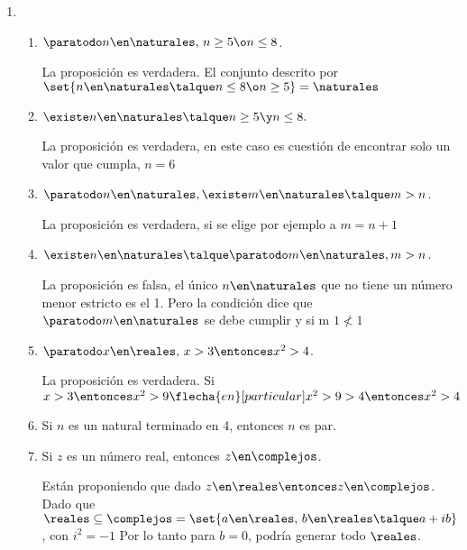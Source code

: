 \begin{enumerate}[label=\roman*)]
  \item

        \begin{enumerate}[label=(\alph*)]
          \item $\paratodo n \en \naturales,\, n \geq 5 \o n \leq 8$.\par
                La proposición es verdadera. El conjunto descrito por $\set{ n \en \naturales \talque n \leq 8 \o n \geq 5} = \naturales$\par
                \doceiA                        \par

          \item $\existe n \en \naturales \talque n \geq 5 \y n\leq 8.$\par
                La proposición es verdadera, en este caso es cuestión de encontrar solo un valor que cumpla, $n = 6$

          \item $\paratodo n \en \naturales, \existe m \en \naturales \talque m > n$.\par
                La proposición es verdadera, si se elige por ejemplo a $m = n+1$

          \item $\existe n \en \naturales \talque \paratodo m \en \naturales, m >n$.\par
                La proposición es falsa, el único $n \en \naturales$ que no tiene un número menor estricto es el 1. Pero la condición
                dice que $\paratodo m \en \naturales$ se debe cumplir y si m $1 \nless 1$

          \item $\paratodo x \en \reales,\, x > 3 \entonces x^2 > 4$.\par
                La proposición es verdadera. Si $x > 3 \entonces x^2 > 9 \flecha{en}[particular] x^2 > 9 > 4 \entonces x^2 > 4$

          \item Si $n$ es un natural terminado en 4, entonces $n$ es par.\par

          \item Si $z$ es un número real, entonces $z \en \complejos$.\par
                Están proponiendo que dado
                        $z \en \reales \entonces z \en \complejos$.
                        Dado que 
                        $\reales \subseteq \complejos =
                        \set{a \en \reales,\, b\en \reales \talque a + i b}$,
                        con $i^2 = -1$
                Por lo tanto para $b = 0$, podría generar todo $\reales$.
        \end{enumerate}


\end{enumerate}
